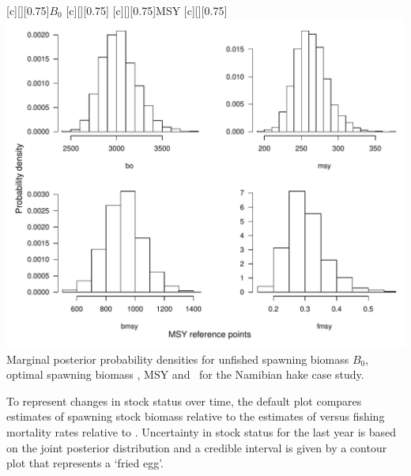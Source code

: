 \begin{multicols}{2}
\begin{figurehere}
	\centering
	[][0.75]{$B_0$}
	[][0.75]{\bmsy}
	[][0.75]{MSY}
	[][0.75]{\fmsy}
	\includegraphics[width=\columnwidth]{iscamFigs/nHakerefpoints.pdf}\\
	\caption{Marginal posterior probability densities for unfished spawning biomass $B_0$, optimal spawning biomass \bmsy, MSY and \fmsy\ for the Namibian hake case study.}\label{fig6}
\end{figurehere}

To represent changes in stock status over time, the default plot compares estimates of spawning stock biomass relative to the estimates of \bmsy versus fishing mortality rates relative to \fmsy.  Uncertainty in stock status for the last year is based on the joint posterior distribution and a credible interval is given by a contour plot that represents a `fried egg'.


\end{multicols}
